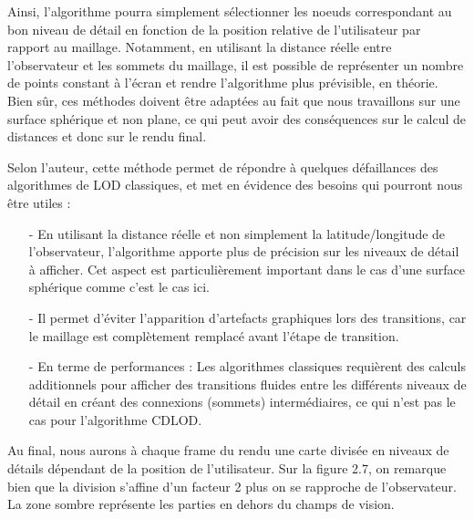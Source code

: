 \documentclass[12pt]{report}
\begin{document}
\vspace{0.5cm}

Ainsi, l'algorithme pourra simplement sélectionner les noeuds correspondant au bon niveau de détail en fonction de la position relative de l'utilisateur par rapport au maillage. Notamment, en utilisant la distance réelle entre l'observateur et les sommets du maillage, il est possible de représenter un nombre de points constant à l'écran et rendre l'algorithme plus prévisible, en théorie. Bien sûr, ces méthodes doivent être adaptées au fait que nous travaillons sur une surface sphérique et non plane, ce qui peut avoir des conséquences sur le calcul de distances et donc sur le rendu final.

\newpage

Selon l'auteur, cette méthode permet de répondre à quelques défaillances des algorithmes de LOD classiques, et met en évidence des besoins qui pourront nous être utiles :

\begin{itemize}
    \item[-] En utilisant la distance réelle et non simplement la latitude/longitude de l'observateur, l'algorithme apporte plus de précision sur les niveaux de détail à afficher. Cet aspect est particulièrement important dans le cas d'une surface sphérique comme c'est le cas ici.
    \item[-] Il permet d'éviter l'apparition d'artefacts graphiques lors des transitions, car le maillage est complètement remplacé avant l'étape de transition.
    \item[-] En terme de performances : Les algorithmes classiques requièrent des calculs additionnels pour afficher des transitions fluides entre les différents niveaux de détail en créant des connexions (sommets) intermédiaires, ce qui n'est pas le cas pour l'algorithme CDLOD.
\end{itemize}


Au final, nous aurons à chaque frame du rendu une carte divisée en niveaux de détails dépendant de la position de l'utilisateur. Sur la figure 2.7, on remarque bien que la division s'affine d'un facteur 2 plus on se rapproche de l'observateur. La zone sombre représente les parties en dehors du champs de vision. 

\vspace{0.3cm}
\end{document}
